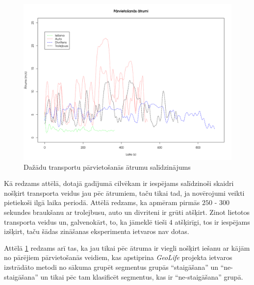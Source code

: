 \documentclass{ludis}
\begin{document}
\begin{figure}
  \centering
  \includegraphics[scale=0.5]{img/speed_comparison}
  \caption{Dažādu transportu pārvietošanās ātrumu salīdzinājums}
  \label{fig:speed_comparison}
\end{figure}

Kā redzams attēlā, dotajā gadījumā cilvēkam ir iespējams salīdzinoši skaidri nošķirt trans\-porta 
veidus jau pēc ātrumiem, taču tikai tad, ja novērojumi veikti pietiekoši ilgā laika periodā.
Attēlā redzams, ka apmēram pirmās $250$ - $300$ sekundes braukšanu ar trolejbusu, auto un divriteni
ir grūti atšķirt. Zinot lietotos transporta veidus un, galvenokārt, to, ka jāmeklē tieši $4$ 
atšķirīgi, tos ir iespējams izšķirt, taču šādas zināšanas eksperimenta ietvaros nav dotas.

Attēlā \ref{fig:speed_comparison} redzams arī tas, ka jau tikai pēc ātruma ir viegli nošķirt iešanu
ar kājām no pārējiem pārvietošanās veidiem, kas apstiprina \emph{GeoLife} projekta ietvaros
izstrādāto metodi no sākuma grupēt segmentus grupās ``staigāšana'' un ``ne-staigāšana'' un tikai
pēc tam klasificēt segmentus, kas ir ``ne-staigāšana'' grupā. ~\cite{zheng_gps_segmentation}
\end{document}
